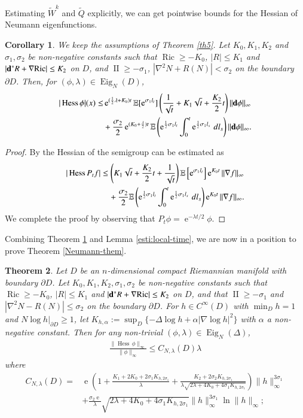 \documentclass[11pt,reqno]{amsart}
\newtheorem{theorem}{Theorem}[section]
\newtheorem{corollary}[theorem]{Corollary}
\theoremstyle{definition} \newtheorem{remark}[theorem]{Remark}
\numberwithin{equation}{section}
\def\Ric{{\operatorname{Ric}}} \def\Hess{\operatorname{Hess}}
\newcommand\1{\mathbbm{1}}
\def\Ric{{\operatorname{Ric}}} \def\Aut{{\operatorname{Aut}}}
\def\Eig{\operatorname{Eig}} \def\II{{\operatorname{II}}}
\def\bd{{\bf d}}
\def\r{\right}
\def\l{\left} \def\e{\operatorname{e}} \def\dsum{\displaystyle\sum}
\def\II{{\operatorname{II}}}
\begin{document}
Estimating  $\tilde{W}^k$ and $ \tilde{Q}$ explicitly, we can get pointwise bounds
for the Hessian of Neumann eigenfunctions. 


\begin{corollary}\label{th-esti-HS}
We keep the assumptions of Theorem \ref{th5}.  Let $K_0, K_1, K_2$ and $\sigma_1, \sigma_2$ be non-negative constants such that 
$\Ric\geq -K_0$, $|R|\leq K_1$ and $|\bd^* R+\nabla \Ric|\leq K_2$ on $D$, and $\II \geq -\sigma_1$,
$|\nabla^2 N+R(N)|<\sigma_2$ on the boundary $\partial D$. 
 Then, 
for $(\phi,\lambda)\in\Eig_N(D)$,
\begin{align*}
|\Hess \phi|(x)\leq & \e^{(\frac12\lambda +K_0)t}\E[\e^{\sigma_1 l_t}]\l(\frac{1}{\sqrt{t}}+K_1 \sqrt{t}+\frac{K_2}{2} t \r)\|\bd \phi\|_{\infty}\\
& +\frac{\sigma_2}{2} \e^{(K_0+\frac{\lambda}{2})t}\E \l(\e^{\frac{1}{2}\sigma_1 l_t}\int_0^t\e^{\frac{1}{2}\sigma_1 l_s}\, d l_s\r)\|\bd \phi\|_{\infty}.
\end{align*}
\end{corollary}
\begin{proof}
By \cite[Theorem 4.1]{CT22} the Hessian of the semigroup can be estimated as
\begin{align*}
|\Hess {P_tf}|& \leq \l(K_1 \sqrt{t}+\frac{K_2}{2} t+\frac{1}{\sqrt{t}} \r) \E\l[\e^{\sigma_1 l_t}\r]\e^{K_0t}  \|\nabla f\|_{\infty} \\
&\quad  +\frac{\sigma_2}{2}  \E \l(\e^{\frac{1}{2}\sigma_1 l_t}\int_0^t\e^{\frac{1}{2}\sigma_1 l_s}\, d l_s\r)\e^{K_0t}\|\nabla f\|_{\infty}.
\end{align*}
We complete the proof by observing that $P_t\phi=\e^{-\lambda t/2}\phi$.
\end{proof}


Combining Theorem \ref{th-esti-HS} and Lemma \ref{esti:local-time}, we are now in a position to prove
Theorem \ref{Neumann-them}. 
\begin{theorem}\label{Neumann-th0}
Let $D$ be an $n$-dimensional compact Riemannian manifold with
boundary $\partial D$. Let $K_0,K_1,K_2, \sigma_1, \sigma_2$ be non-negative constants such that $\Ric\geq -K_0$, $|R|\leq K_1$ and
$|\bd^* R+\nabla \Ric|\leq K_2$ on $D$, and that
$\II\geq -\sigma_1$ and $|\nabla^2 N-R(N)|\leq \sigma_2$ on the
boundary $\partial D$.  For $h\in C^{\infty}(D)$ with
$\min_Dh =1$ and $N\log h|_{\partial D}\geq 1$, let
$K_{h,\alpha}:=\sup_{D}\{-\Delta \log h+\alpha |\nabla \log h|^2\}$
with $\alpha$ a non-negative constant. Then for any non-trivial
$(\phi,\lambda) \in \Eig_N(\Delta)$, 
\begin{align*}
\frac{\|\Hess \,\phi\|_{\infty}}{\|\phi\|_{\infty}}\leq C_{N,\lambda}(D)\lambda
\end{align*}
where
\begin{align*}
C_{N,\lambda}(D)=&\e\l(1+\frac{K_1+2K_0+2\sigma_1 K_{h,2\sigma_1}}{\lambda}+\frac{K_2+2\sigma_2 K_{h,2\sigma_1}}{\lambda\sqrt{2\lambda+4K_0+4\sigma_1 K_{h,2 \sigma_1}}}\r)\|h\|_{\infty}^{3\sigma_1}\\
&+\frac{ \sigma_2 \e}{\lambda}\sqrt{2\lambda+4K_0+4\sigma_1 K_{h,2\sigma_1}}\|h\|_{\infty}^{3\sigma_1}\ln \|h\|_{\infty};
\end{align*}
\end{theorem}
\end{document}
